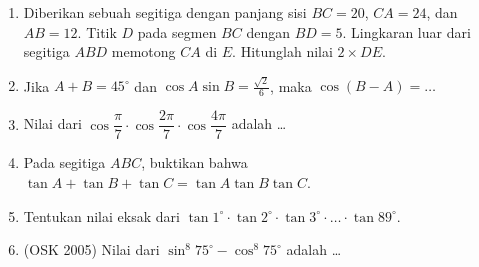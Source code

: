 \begin{enumerate}
	\item
		Diberikan sebuah segitiga dengan panjang sisi $BC = 20$, $CA = 24$, dan $AB=12$. Titik $D$ pada segmen $BC$ dengan $BD = 5$. Lingkaran luar dari segitiga $ABD$ memotong $CA$ di $E$. Hitunglah nilai $2 \times DE$.
		
	\item Jika $A+B=45^\circ$ dan $\cos A\sin B=\frac{\sqrt{2}}{6}$, maka $\cos(B-A)=\dots$
	
	\item Nilai dari $\cos \dfrac{\pi}{7}\cdot \cos \dfrac{2\pi}{7} \cdot \cos \dfrac{4\pi}{7}$ adalah \dots
	
	\item Pada segitiga $ABC$, buktikan bahwa $\tan A + \tan B + \tan C = \tan A \tan B \tan C$.
	
	\item Tentukan nilai eksak dari $\tan 1^\circ \cdot \tan 2^\circ \cdot \tan 3^\circ \cdot \ldots \cdot \tan 89^\circ$.
	
	\item (OSK 2005) Nilai dari $\sin^8 75^\circ - \cos^8 75^\circ$ adalah \dots
\end{enumerate}